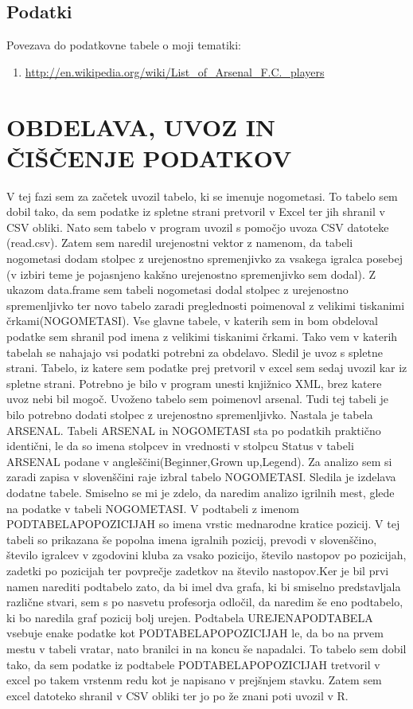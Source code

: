 \documentclass[11pt,a4paper]{article}
\begin{document}
\subsection{Podatki}
Povezava do podatkovne tabele o moji tematiki: 
\begin{enumerate}
\item{\url{http://en.wikipedia.org/wiki/List_of_Arsenal_F.C._players}}
\end{enumerate}

\newpage
\section{OBDELAVA, UVOZ IN ČIŠČENJE PODATKOV}
V tej fazi sem za začetek uvozil tabelo, ki se imenuje nogometasi. To tabelo sem dobil tako, da sem podatke iz spletne strani pretvoril v Excel ter jih shranil v CSV obliki. Nato sem tabelo v program uvozil s pomočjo uvoza CSV datoteke (read.csv). Zatem sem naredil urejenostni vektor z namenom, da tabeli nogometasi dodam stolpec z urejenostno spremenjivko za vsakega igralca posebej (v izbiri teme je pojasnjeno kakšno urejenostno spremenjivko sem dodal). Z ukazom data.frame sem tabeli nogometasi dodal stolpec z urejenostno spremenljivko ter novo tabelo zaradi preglednosti poimenoval z velikimi tiskanimi črkami(NOGOMETASI). Vse glavne tabele, v katerih sem in bom obdeloval podatke sem shranil pod imena z velikimi tiskanimi črkami. Tako vem v katerih tabelah se nahajajo vsi podatki potrebni za obdelavo.
Sledil je uvoz s spletne strani. Tabelo, iz katere sem podatke prej pretvoril v excel sem sedaj uvozil kar iz spletne strani. Potrebno je bilo v program unesti knjižnico XML, brez katere uvoz nebi bil mogoč. Uvoženo tabelo sem poimenovl arsenal. Tudi tej tabeli je bilo potrebno dodati stolpec z urejenostno spremenljivko. Nastala je tabela ARSENAL. Tabeli ARSENAL in NOGOMETASI sta po podatkih praktično identični, le da so imena stolpcev in vrednosti v stolpcu  Status v tabeli ARSENAL podane v angleščini(Beginner,Grown up,Legend). Za analizo sem si zaradi zapisa v slovenščini raje izbral tabelo NOGOMETASI.
Sledila je izdelava dodatne tabele. Smiselno se mi je zdelo, da naredim analizo igrilnih mest, glede na podatke v tabeli NOGOMETASI. V podtabeli z imenom PODTABELAPOPOZICIJAH so imena vrstic mednarodne kratice pozicij. V tej tabeli so prikazana še popolna imena igralnih pozicij, prevodi v slovenščino, število igralcev v zgodovini kluba za vsako pozicijo, število nastopov po pozicijah, zadetki po pozicijah ter povprečje zadetkov na število nastopov.Ker je bil prvi namen narediti podtabelo zato, da bi imel dva grafa, ki bi smiselno predstavljala različne stvari, sem s po nasvetu profesorja odločil, da naredim še eno podtabelo, ki bo naredila graf pozicij bolj urejen. Podtabela UREJENAPODTABELA vsebuje enake podatke kot PODTABELAPOPOZICIJAH le, da bo na prvem mestu v tabeli vratar, nato branilci in na koncu še napadalci. To tabelo sem dobil tako, da sem podatke iz podtabele PODTABELAPOPOZICIJAH tretvoril v excel po takem vrstenm redu kot je napisano v prejšnjem stavku. Zatem sem excel datoteko shranil v CSV obliki ter jo po že znani poti uvozil v R.
\end{document}
